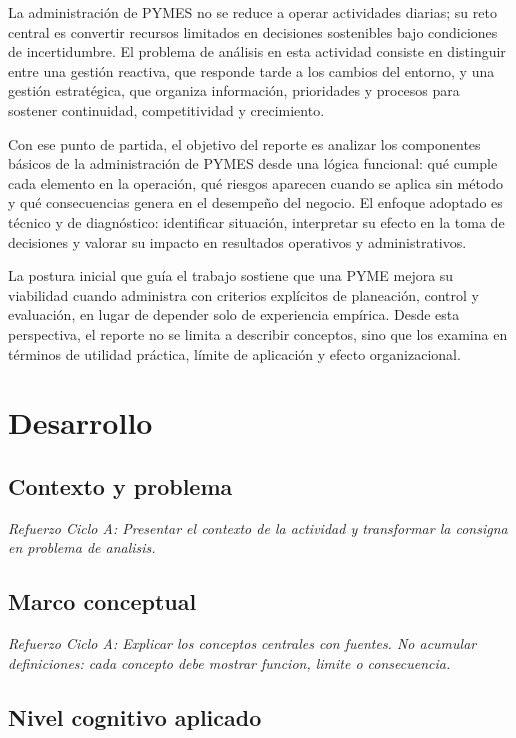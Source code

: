 \documentclass[
	spanish,
	letterpaper, oneside
]{article}
\begin{document}
La administración de PYMES no se reduce a operar actividades diarias; su reto central es convertir recursos limitados en decisiones sostenibles bajo condiciones de incertidumbre. El problema de análisis en esta actividad consiste en distinguir entre una gestión reactiva, que responde tarde a los cambios del entorno, y una gestión estratégica, que organiza información, prioridades y procesos para sostener continuidad, competitividad y crecimiento.

Con ese punto de partida, el objetivo del reporte es analizar los componentes básicos de la administración de PYMES desde una lógica funcional: qué cumple cada elemento en la operación, qué riesgos aparecen cuando se aplica sin método y qué consecuencias genera en el desempeño del negocio. El enfoque adoptado es técnico y de diagnóstico: identificar situación, interpretar su efecto en la toma de decisiones y valorar su impacto en resultados operativos y administrativos.

La postura inicial que guía el trabajo sostiene que una PYME mejora su viabilidad cuando administra con criterios explícitos de planeación, control y evaluación, en lugar de depender solo de experiencia empírica. Desde esta perspectiva, el reporte no se limita a describir conceptos, sino que los examina en términos de utilidad práctica, límite de aplicación y efecto organizacional.

\section{Desarrollo}

\subsection{Contexto y problema}

\textit{Refuerzo Ciclo A: Presentar el contexto de la actividad y transformar la consigna en problema de analisis.}

\subsection{Marco conceptual}

\textit{Refuerzo Ciclo A: Explicar los conceptos centrales con fuentes. No acumular definiciones: cada concepto debe mostrar funcion, limite o consecuencia.}

\subsection{Nivel cognitivo aplicado}
\end{document}
